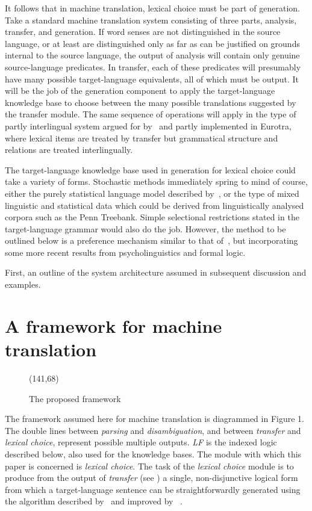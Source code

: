 It follows that in machine translation, lexical choice must be part of
generation. Take a standard machine translation system consisting of three
parts, analysis, transfer, and generation. If word senses are not
distinguished in the source language, or
at least are distinguished only as far as can be justified on grounds
internal to the source language, the output of analysis will contain only
genuine source-language predicates. In transfer, each of these predicates will
presumably have many possible target-language equivalents, all of which must
be output. It will be the job of the generation component to apply the
target-language knowledge base to choose between the many possible
translations suggested by the transfer module. The same sequence of operations
will apply in the type of partly interlingual system argued
for by~\cite{eynde:92:a}
and partly implemented in Eurotra, where lexical items are treated by
transfer but grammatical structure and relations are treated interlingually.

The target-language knowledge base used in generation for lexical choice
could take a variety of forms.
Stochastic methods immediately spring to mind of course, either the purely
statistical language model described by~\cite{brown:90:a},
or the type of mixed linguistic and statistical data which could be
derived from linguistically analysed corpora
such as the Penn Treebank. Simple selectional restrictions stated in the
target-language grammar would also do the job. However, the method to be
outlined below is a preference mechanism similar to
that of~\cite{wilks:75:a},
but incorporating some more recent results from psycholinguistics and
formal logic.

First, an outline of the system architecture assumed in subsequent
discussion and examples. 

\section{A framework for machine translation}

\begin{figure}[htbp]
  \begin{center}
    \leavevmode
    \atari(141,68)

    \caption{The proposed framework}
  \end{center}
\end{figure}

The framework assumed here for machine translation is diagrammed in Figure 1.
The double lines between
{\it parsing\/}
and
{\it disambiguation},
and between
{\it transfer\/}
and
{\it lexical choice},
represent possible multiple outputs.
{\it LF\/}
is the indexed logic described below, also used for the knowledge bases.
The module with which this paper is concerned is
{\it lexical choice}.
The task of the
{\it lexical choice\/}
module is to produce from the output of
{\it transfer\/}
(see \cite{phillips:93:c,phillips:93:b})
a single, non-disjunctive logical form from which a target-language
sentence can be straightforwardly generated using the algorithm
described by~\cite{phillips:93:a} and improved by ~\cite{lager:94:a}.

